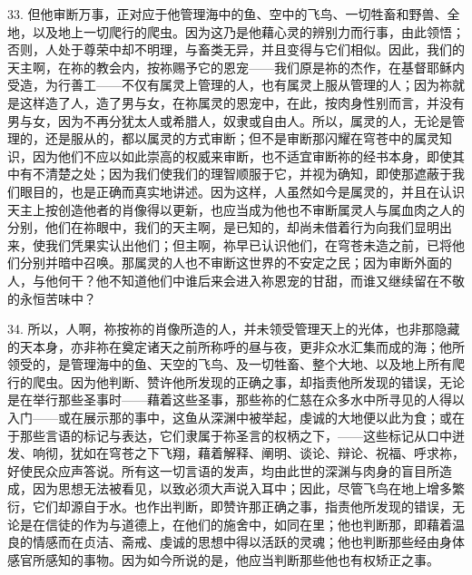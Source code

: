 33. 但他审断万事，正对应于他管理海中的鱼、空中的飞鸟、一切牲畜和野兽、全地，以及地上一切爬行的爬虫。因为这乃是他藉心灵的辨别力而行事，由此领悟；否则，人处于尊荣中却不明理，与畜类无异，并且变得与它们相似。因此，我们的天主啊，在祢的教会内，按祢赐予它的恩宠——我们原是祢的杰作，在基督耶稣内受造，为行善工——不仅有属灵上管理的人，也有属灵上服从管理的人；因为祢就是这样造了人，造了男与女，在祢属灵的恩宠中，在此，按肉身性别而言，并没有男与女，因为不再分犹太人或希腊人，奴隶或自由人。所以，属灵的人，无论是管理的，还是服从的，都以属灵的方式审断；但不是审断那闪耀在穹苍中的属灵知识，因为他们不应以如此崇高的权威来审断，也不适宜审断祢的经书本身，即使其中有不清楚之处；因为我们使我们的理智顺服于它，并视为确知，即使那遮蔽于我们眼目的，也是正确而真实地讲述。因为这样，人虽然如今是属灵的，并且在认识天主上按创造他者的肖像得以更新，也应当成为他也不审断属灵人与属血肉之人的分别，他们在祢眼中，我们的天主啊，是已知的，却尚未借着行为向我们显明出来，使我们凭果实认出他们；但主啊，祢早已认识他们，在穹苍未造之前，已将他们分别并暗中召唤。那属灵的人也不审断这世界的不安定之民；因为审断外面的人，与他何干？他不知道他们中谁后来会进入祢恩宠的甘甜，而谁又继续留在不敬的永恒苦味中？\par

34. 所以，人啊，祢按祢的肖像所造的人，并未领受管理天上的光体，也非那隐藏的天本身，亦非祢在奠定诸天之前所称呼的昼与夜，更非众水汇集而成的海；他所领受的，是管理海中的鱼、天空的飞鸟、及一切牲畜、整个大地、以及地上所有爬行的爬虫。因为他判断、赞许他所发现的正确之事，却指责他所发现的错误，无论是在举行那些圣事时——藉着这些圣事，那些祢的仁慈在众多水中所寻见的人得以入门——或在展示那的事中，这鱼从深渊中被举起，虔诚的大地便以此为食；或在于那些言语的标记与表达，它们隶属于祢圣言的权柄之下，——这些标记从口中迸发、响彻，犹如在穹苍之下飞翔，藉着解释、阐明、谈论、辩论、祝福、呼求祢，好使民众应声答说。所有这一切言语的发声，均由此世的深渊与肉身的盲目所造成，因为思想无法被看见，以致必须大声说入耳中；因此，尽管飞鸟在地上增多繁衍，它们却源自于水。也作出判断，即赞许那正确之事，指责他所发现的错误，无论是在信徒的作为与道德上，在他们的施舍中，如同在里；他也判断那，即藉着温良的情感而在贞洁、斋戒、虔诚的思想中得以活跃的灵魂；他也判断那些经由身体感官所感知的事物。因为如今所说的是，他应当判断那些他也有权矫正之事。\par

